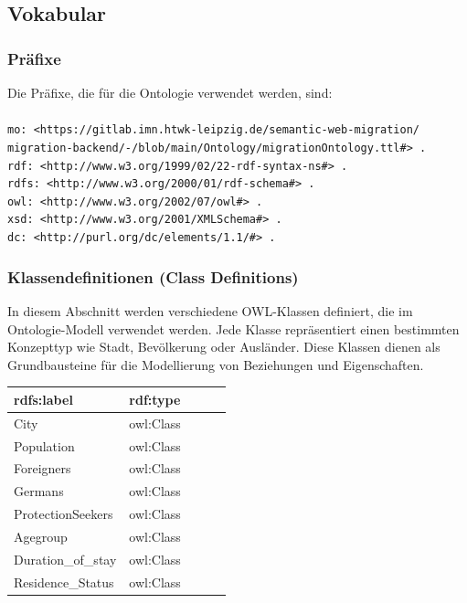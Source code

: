 \documentclass[a4paper, 12pt]{article}
\begin{document}
\subsection{Vokabular}
\subsubsection{Präfixe}
Die Präfixe, die für die Ontologie verwendet werden, sind: \\ \\
\texttt{mo:         <https://gitlab.imn.htwk-leipzig.de/semantic-web-migration/\\ migration-backend/-/blob/main/Ontology/migrationOntology.ttl\#> . }\\
\texttt{rdf:        <http://www.w3.org/1999/02/22-rdf-syntax-ns\#> .  }\\
\texttt{rdfs: 		<http://www.w3.org/2000/01/rdf-schema\#> .  }\\
\texttt{owl: 		<http://www.w3.org/2002/07/owl\#> .  }\\
\texttt{xsd: 		<http://www.w3.org/2001/XMLSchema\#> .  }\\
\texttt{dc: 		<http://purl.org/dc/elements/1.1/\#> .  }\\


\subsubsection{Klassendefinitionen (Class Definitions)}

In diesem Abschnitt werden verschiedene OWL-Klassen definiert, die im Ontologie-Modell verwendet werden. Jede Klasse repräsentiert einen bestimmten Konzepttyp wie Stadt, Bevölkerung oder Ausländer. Diese Klassen dienen als Grundbausteine für die Modellierung von Beziehungen und Eigenschaften. \\

\begin{tabular}{|l|l|l|l|l|}
    \hline
    rdfs:label & rdf:type \\
    \hline
    City & owl:Class  \\
    Population & owl:Class  \\
    Foreigners & owl:Class  \\
    Germans & owl:Class  \\
    ProtectionSeekers & owl:Class  \\
    Agegroup & owl:Class  \\
    Duration\_of\_stay & owl:Class  \\
    Residence\_Status & owl:Class  \\
    \hline
\end{tabular}
\end{document}
